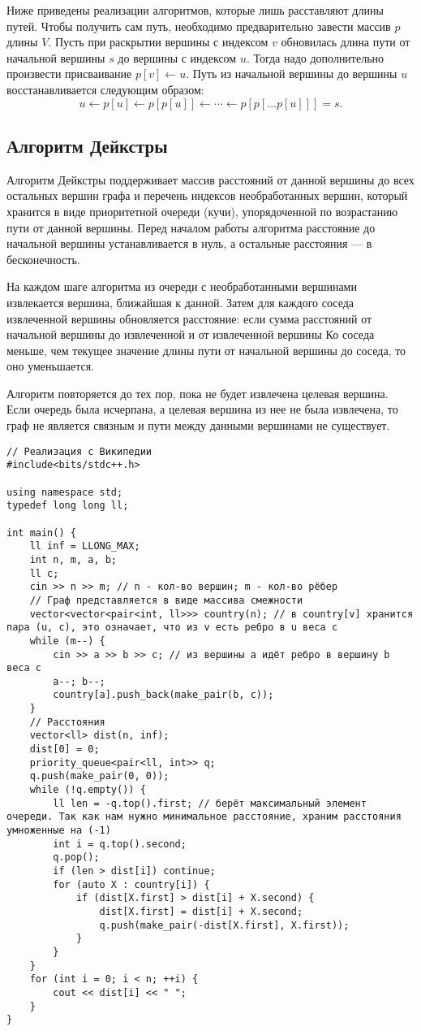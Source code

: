 Ниже приведены
реализации алгоритмов, которые лишь расставляют длины путей.
Чтобы получить сам путь, необходимо предварительно завести массив $p$ длины $V$.
Пусть при раскрытии вершины с индексом $v$ обновилась длина пути от начальной вершины $s$ до вершины
с индексом $u$. Тогда надо дополнительно произвести присваивание $p[v] \gets u$.
Путь из начальной вершины до вершины $u$ восстанавливается следующим образом:
$$u \gets p[u] \gets p[p[u]] \gets \cdots \gets p[p[\dots p[u]]] = s. $$

\subsection{Алгоритм Дейкстры}
Алгоритм Дейкстры поддерживает массив расстояний от данной вершины до всех
остальных вершин графа и перечень индексов необработанных вершин, который хранится в
виде приоритетной очереди (кучи), упорядоченной по возрастанию пути от данной вершины.
Перед началом работы алгоритма расстояние до начальной вершины устанавливается в нуль,
а остальные расстояния --- в бесконечность.

На каждом шаге алгоритма из очереди с необработанными вершинами извлекается
вершина, ближайшая к данной. Затем для каждого соседа извлеченной вершины
обновляется расстояние: если сумма расстояний от начальной вершины до извлеченной
и от извлеченной вершины Ко соседа меньше, чем текущее значение длины пути от начальной
вершины до соседа, то оно уменьшается.

Алгоритм повторяется до тех пор, пока не будет извлечена целевая вершина.
Если очередь была исчерпана, а целевая вершина из нее не была извлечена, то
граф не является связным и пути между данными вершинами не существует.

\begin{verbatim}
// Реализация с Википедии
#include<bits/stdc++.h>

using namespace std;
typedef long long ll;

int main() {
    ll inf = LLONG_MAX;
    int n, m, a, b;
    ll c;
    cin >> n >> m; // n - кол-во вершин; m - кол-во рёбер
    // Граф представляется в виде массива смежности
    vector<vector<pair<int, ll>>> country(n); // в country[v] хранится пара (u, c), это означает, что из v есть ребро в u веса c
    while (m--) {
        cin >> a >> b >> c; // из вершины a идёт ребро в вершину b веса c
        a--; b--;
        country[a].push_back(make_pair(b, c));
    }
    // Расстояния
    vector<ll> dist(n, inf);
    dist[0] = 0;
    priority_queue<pair<ll, int>> q;
    q.push(make_pair(0, 0));
    while (!q.empty()) {
        ll len = -q.top().first; // берёт максимальный элемент очереди. Так как нам нужно минимальное расстояние, храним расстояния умноженные на (-1)
        int i = q.top().second;
        q.pop();
        if (len > dist[i]) continue;
        for (auto X : country[i]) {
            if (dist[X.first] > dist[i] + X.second) {
                dist[X.first] = dist[i] + X.second;
                q.push(make_pair(-dist[X.first], X.first));
    	    }
        }
    }
    for (int i = 0; i < n; ++i) {
        cout << dist[i] << " ";
    }
}
\end{verbatim}

